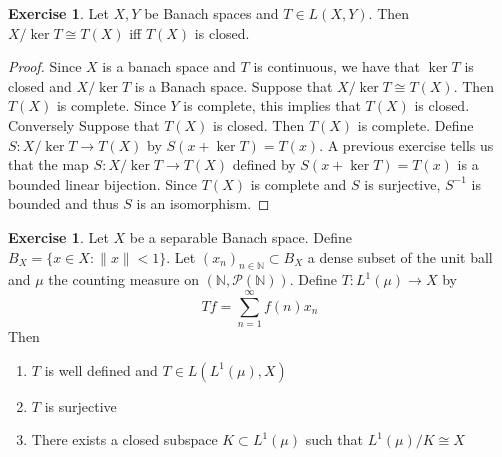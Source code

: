 \documentclass[12pt]{amsart}
\theoremstyle{definition}
\newtheorem{ex}[definition]{Exercise}
\newcommand{\N}{\mathbb{N}}
\newcommand{\MP}{\mathcal{P}}
\begin{document}
	\begin{ex}
		Let $X, Y$ be Banach spaces and $T \in L(X,Y)$. Then $X/\ker T \cong T(X)$ iff $T(X)$ is closed.
	\end{ex}
	
	\begin{proof}
		Since $X$ is a banach space and $T$ is continuous, we have that $\ker T$ is closed and $X/ \ker T$ is a Banach space. Suppose that $X/ \ker T \cong T(X)$. Then $T(X)$ is complete. Since $Y$ is complete, this implies that $T(X)$ is closed. \\
		Conversely Suppose that $T(X)$ is closed. Then $T(X)$ is complete. Define $S: X/ \ker T \rightarrow T(X)$ by $S(x + \ker T) = T(x)$. A previous exercise tells us that the map $S: X/ \ker T \rightarrow T(X)$ defined by $S(x + \ker T) = T(x)$ is a bounded linear bijection. Since $T(X)$ is complete and $S$ is surjective, $S^{-1}$ is bounded and thus $S$ is an isomorphism.   
	\end{proof}
	
	\begin{ex}
		Let $X$ be a separable Banach space. Define $B_X = \{x \in X: \|x \|< 1\}$. Let $(x_n)_{n \in \N} \subset B_X $ a dense subset of the unit ball and $\mu$ the counting measure on $(\N, \MP(\N))$. Define $T: L^1(\mu) \rightarrow X$ by $$Tf = \sum_{n=1}^{\infty}f(n)x_n$$ Then 
		\begin{enumerate}
			\item $T$ is well defined and $T \in L(L^1(\mu), X)$
			\item $T$ is surjective
			\item There exists a closed subspace $K \subset L^1(\mu)$ such that $L^1(\mu)/K \cong X$ 
		\end{enumerate} 
	\end{ex}
	
\end{document}
